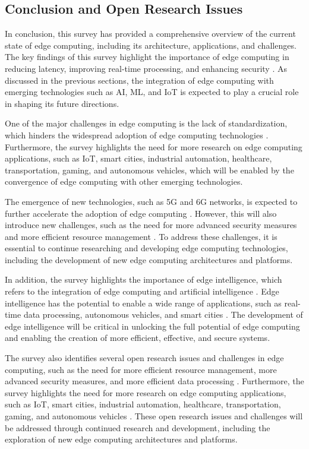 \documentclass[11pt]{article}
\begin{document}
\subsection{Conclusion and Open Research Issues}

In conclusion, this survey has provided a comprehensive overview of the current state of edge computing, including its architecture, applications, and challenges. The key findings of this survey highlight the importance of edge computing in reducing latency, improving real-time processing, and enhancing security \cite{ref3}. As discussed in the previous sections, the integration of edge computing with emerging technologies such as AI, ML, and IoT is expected to play a crucial role in shaping its future directions.

One of the major challenges in edge computing is the lack of standardization, which hinders the widespread adoption of edge computing technologies \cite{ref1}. Furthermore, the survey highlights the need for more research on edge computing applications, such as IoT, smart cities, industrial automation, healthcare, transportation, gaming, and autonomous vehicles, which will be enabled by the convergence of edge computing with other emerging technologies.

The emergence of new technologies, such as 5G and 6G networks, is expected to further accelerate the adoption of edge computing \cite{ref13}. However, this will also introduce new challenges, such as the need for more advanced security measures and more efficient resource management \cite{ref80}. To address these challenges, it is essential to continue researching and developing edge computing technologies, including the development of new edge computing architectures and platforms.

In addition, the survey highlights the importance of edge intelligence, which refers to the integration of edge computing and artificial intelligence \cite{ref81}. Edge intelligence has the potential to enable a wide range of applications, such as real-time data processing, autonomous vehicles, and smart cities \cite{ref28}. The development of edge intelligence will be critical in unlocking the full potential of edge computing and enabling the creation of more efficient, effective, and secure systems.

The survey also identifies several open research issues and challenges in edge computing, such as the need for more efficient resource management, more advanced security measures, and more efficient data processing \cite{ref6}. Furthermore, the survey highlights the need for more research on edge computing applications, such as IoT, smart cities, industrial automation, healthcare, transportation, gaming, and autonomous vehicles \cite{ref21}. These open research issues and challenges will be addressed through continued research and development, including the exploration of new edge computing architectures and platforms.
\end{document}
